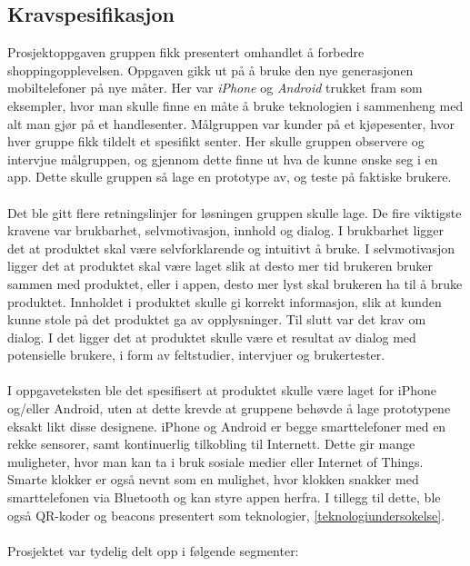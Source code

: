 \subsection{Kravspesifikasjon}
Prosjektoppgaven gruppen fikk presentert omhandlet å forbedre shoppingopplevelsen. Oppgaven gikk ut på å bruke den nye generasjonen mobiltelefoner på nye måter. Her var \textit{iPhone} og \textit{Android} trukket fram som eksempler, hvor man skulle finne en måte å bruke teknologien i sammenheng med alt man gjør på et handlesenter. Målgruppen var kunder på et kjøpesenter, hvor hver gruppe fikk tildelt et spesifikt senter. Her skulle gruppen observere og intervjue målgruppen, og gjennom dette finne ut hva de kunne ønske seg i en app. Dette skulle gruppen så lage en prototype av, og teste på faktiske brukere.
\\\\
Det ble gitt flere retningslinjer for løsningen gruppen skulle lage. De fire viktigste kravene var brukbarhet, selvmotivasjon, innhold og dialog. I brukbarhet ligger det at produktet skal være selvforklarende og intuitivt å bruke. I selvmotivasjon ligger det at produktet skal være laget slik at desto mer tid brukeren bruker sammen med produktet, eller i appen, desto mer lyst skal brukeren ha til å bruke produktet. Innholdet i produktet skulle gi korrekt informasjon, slik at kunden kunne stole på det produktet ga av opplysninger. Til slutt var det krav om dialog. I det ligger det at produktet skulle være et resultat av dialog med potensielle brukere, i form av feltstudier, intervjuer og brukertester.
\\\\
I oppgaveteksten ble det spesifisert at produktet skulle være laget for iPhone og/eller Android, uten at dette krevde at gruppene behøvde å lage prototypene eksakt likt disse designene. iPhone og Android er begge smarttelefoner med en rekke sensorer, samt kontinuerlig tilkobling til Internett. Dette gir mange muligheter, hvor man kan ta i bruk sosiale medier eller Internet of Things. Smarte klokker er også nevnt som en mulighet, hvor klokken snakker med smarttelefonen via Bluetooth og kan styre appen herfra. I tillegg til dette, ble også QR-koder og beacons presentert som teknologier, \ref{teknologiundersokelse}.
\\\\
\noindent Prosjektet var tydelig delt opp i følgende segmenter:
